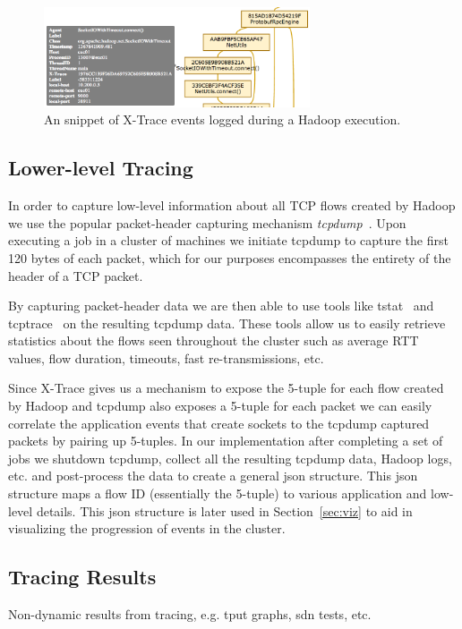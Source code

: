 \begin{figure}
\centering
\includegraphics[width=0.7\textwidth]{figures/xtrace-example2.png}
\caption{An snippet of X-Trace events logged during a Hadoop execution.}
\label{fig:xtrace}
\end{figure}

\subsection{Lower-level Tracing}
\label{ssec:low}
In order to capture low-level information about all TCP flows created by Hadoop 
we use the popular packet-header capturing mechanism \emph{tcpdump}~\cite{tcpdump}.
Upon executing a job in a cluster of machines we initiate tcpdump to capture the 
first 120 bytes of each packet, which for our purposes encompasses the entirety of 
the header of a TCP packet. 

By capturing packet-header data we are then able to use tools like tstat~\cite{tstat}
and tcptrace~\cite{tcptrace} on the resulting tcpdump data. These tools allow us to 
easily retrieve statistics about the flows seen throughout the cluster such as 
average RTT values, flow duration, timeouts, fast re-transmissions, etc. 

Since X-Trace gives us a mechanism to expose the 5-tuple for each flow created by 
Hadoop and tcpdump also exposes a 5-tuple for each packet we can easily correlate
the application events that create sockets to the tcpdump captured packets by 
pairing up 5-tuples. In our implementation after completing a set of jobs we 
shutdown tcpdump, collect all the resulting tcpdump data, Hadoop logs, etc. and 
post-process the data to create a general json structure. This json structure maps
a flow ID (essentially the 5-tuple) to various application and low-level details. 
This json structure is later used in Section~\ref{sec:viz} to aid in visualizing the 
progression of events in the cluster.

\subsection{Tracing Results}
\label{ssec:results}
Non-dynamic results from tracing, e.g. tput graphs, sdn tests, etc.

